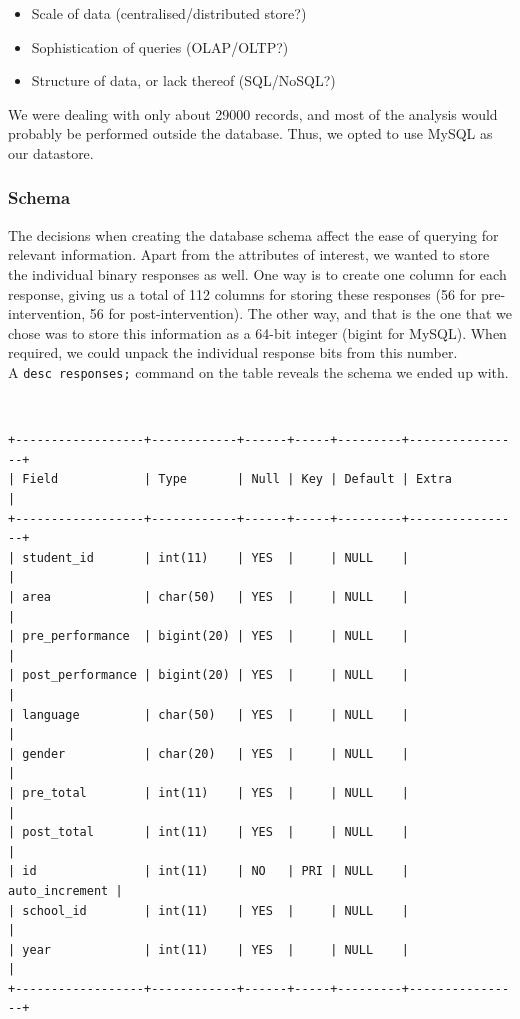 \documentclass[10pt]{article}
\begin{document}
\begin{itemize}
\item Scale of data (centralised/distributed store?)
\item Sophistication of queries (OLAP/OLTP?)
\item Structure of data, or lack thereof (SQL/NoSQL?)
\end{itemize}

We were dealing with only about 29000 records, and most of the analysis would probably be performed outside the database. Thus, we opted to use MySQL as our datastore.

\subsubsection{Schema}
The decisions when creating the database schema affect the ease of querying for relevant information. Apart from the attributes of interest, we wanted to store the individual binary responses as well. One way is to create one column for each response, giving us a total of 112 columns for storing these responses (56 for pre-intervention, 56 for post-intervention). The other way, and that is the one that we chose was to store this information as a 64-bit integer (bigint for MySQL). When required, we could unpack the individual response bits from this number.\\
A {\tt desc responses;} command on the table reveals the schema we ended up with.

{\tt
\begin{verbatim}
+------------------+------------+------+-----+---------+----------------+
| Field            | Type       | Null | Key | Default | Extra          |
+------------------+------------+------+-----+---------+----------------+
| student_id       | int(11)    | YES  |     | NULL    |                |
| area             | char(50)   | YES  |     | NULL    |                |
| pre_performance  | bigint(20) | YES  |     | NULL    |                |
| post_performance | bigint(20) | YES  |     | NULL    |                |
| language         | char(50)   | YES  |     | NULL    |                |
| gender           | char(20)   | YES  |     | NULL    |                |
| pre_total        | int(11)    | YES  |     | NULL    |                |
| post_total       | int(11)    | YES  |     | NULL    |                |
| id               | int(11)    | NO   | PRI | NULL    | auto_increment |
| school_id        | int(11)    | YES  |     | NULL    |                |
| year             | int(11)    | YES  |     | NULL    |                |
+------------------+------------+------+-----+---------+----------------+
\end{verbatim}
}
\end{document}
